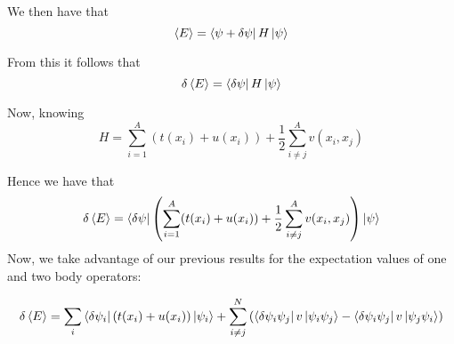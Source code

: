 \documentclass[11pt]{article} %
\begin{document}
We then have that\\

\begin{equation}
\braket{E}=\bra{\psi+\delta\psi}H\ket{\psi}
\end{equation}

From this it follows that \\

\begin{equation}
\delta \braket{E}=\bra{\delta\psi}H\ket{\psi}
\end{equation}

Now, knowing\\

\begin{equation}
H=\sum_{i=1}^A(t(x_i)+u(x_i))+\frac{1}{2} \sum_{i\neq j}^A v(x_i,x_j)
\end{equation}

Hence we have that\\

\begin{equation}
\delta \braket{E}=\bra{\delta\psi}\left(\sum_{i=1}^A(t(x_i)+u(x_i))+\frac{1}{2} \sum_{i\neq j}^A v(x_i,x_j)\right)\ket{\psi}
\end{equation}
Now, we take advantage of our previous results for the expectation values of one and two body operators:

\begin{equation}
\delta \braket{E}=\sum_{i} \bra{\delta\psi_i}\left(t(x_i)+u(x_i)\right)\ket{\psi_i}+\sum_{i\neq j}^N\left( \bra{\delta \psi_i\psi_j}v\ket{\psi_i \psi_j} -\bra{\delta \psi_i\psi_j}v\ket{\psi_j \psi_i}  \right)
\end{equation}

	
\end{document}
